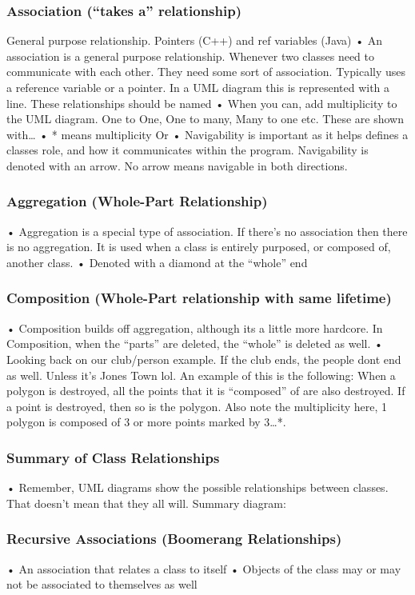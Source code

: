 \documentclass[11pt]{article}
\begin{document}
\subsubsection{Association (“takes a” relationship)}

General purpose relationship. Pointers (C++) and ref variables (Java)
• An association is a general purpose relationship. Whenever two classes need to communicate with
each other. They need some sort of association. Typically uses a reference variable or a pointer. In a
UML diagram this is represented with a line. These relationships should be named
• When you can, add multiplicity to the UML diagram. One to One, One to many, Many to one etc. These
are shown with…
• * means multiplicity
Or
• Navigability is important as it helps defines a classes role, and how it communicates within the program.
Navigability is denoted with an arrow. No arrow means navigable in both directions.
\subsubsection{Aggregation (Whole-Part Relationship)}
• Aggregation is a special type of association. If there's no association then there is no aggregation. It
is used when a class is entirely purposed, or composed of, another class.
• Denoted with a diamond at the “whole” end
\subsubsection{Composition (Whole-Part relationship with same lifetime)}
• Composition builds off aggregation, although its a little more hardcore. In Composition, when the
“parts” are deleted, the “whole” is deleted as well.
• Looking back on our club/person example. If the club ends, the people dont end as well. Unless it’s
Jones Town lol.
An example of this is the following:
When a polygon is destroyed, all the points that it is “composed” of are also destroyed. If a point is
destroyed, then so is the polygon. Also note the multiplicity here, 1 polygon is composed of 3 or more
points marked by 3…*.
\subsubsection{Summary of Class Relationships}
• Remember, UML diagrams show the possible relationships between classes. That doesn't mean that
they all will.
Summary diagram:
\subsubsection{Recursive Associations (Boomerang Relationships)}
• An association that relates a class to itself
• Objects of the class may or may not be associated to themselves as well
\end{document}

